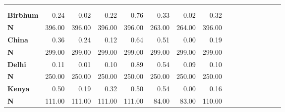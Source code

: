 \begin{tabular}{@{\extracolsep{5pt}}lrrrrrrrrrrrrrrr}
\toprule
&  &  &  &  &  &  &  \\
{\bf } &  &  &  &  &  &  &  \\
\hline
{\bf Birbhum} & 0.24\phantom{***} & 0.02\phantom{***} & 0.22\phantom{***} & 0.76\phantom{***} & 0.33\phantom{***} & 0.02\phantom{***} & 0.32\phantom{***} \\
{\bf N} & 396.00\phantom{***} & 396.00\phantom{***} & 396.00\phantom{***} & 396.00\phantom{***} & 263.00\phantom{***} & 264.00\phantom{***} & 396.00\phantom{***} \\
{\bf China} & 0.36\phantom{***} & 0.24\phantom{***} & 0.12\phantom{***} & 0.64\phantom{***} & 0.51\phantom{***} & 0.00\phantom{***} & 0.19\phantom{***} \\
{\bf N} & 299.00\phantom{***} & 299.00\phantom{***} & 299.00\phantom{***} & 299.00\phantom{***} & 299.00\phantom{***} & 299.00\phantom{***} & 299.00\phantom{***} \\
{\bf Delhi} & 0.11\phantom{***} & 0.01\phantom{***} & 0.10\phantom{***} & 0.89\phantom{***} & 0.54\phantom{***} & 0.09\phantom{***} & 0.10\phantom{***} \\
{\bf N} & 250.00\phantom{***} & 250.00\phantom{***} & 250.00\phantom{***} & 250.00\phantom{***} & 250.00\phantom{***} & 250.00\phantom{***} & 250.00\phantom{***} \\
{\bf Kenya} & 0.50\phantom{***} & 0.19\phantom{***} & 0.32\phantom{***} & 0.50\phantom{***} & 0.54\phantom{***} & 0.00\phantom{***} & 0.16\phantom{***} \\
{\bf N} & 111.00\phantom{***} & 111.00\phantom{***} & 111.00\phantom{***} & 111.00\phantom{***} & 84.00\phantom{***} & 83.00\phantom{***} & 110.00\phantom{***} \\

\end{tabular}
